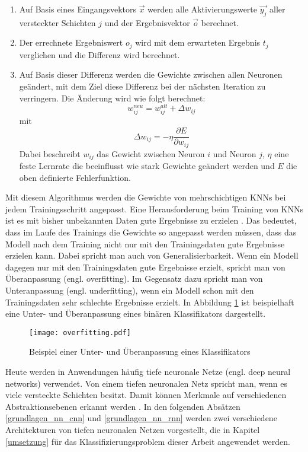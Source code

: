 \begin{enumerate}
\item Auf Basis eines Eingangsvektors $\vec{x}$ werden alle Aktivierungswerte $\vec{y_j}$ aller versteckter Schichten $j$ und der Ergebnisvektor $\vec{o}$ berechnet.
\item Der errechnete Ergebniswert $o_j$ wird mit dem erwarteten Ergebnis $t_j$ verglichen und die Differenz wird berechnet.
\item Auf Basis dieser Differenz werden die Gewichte zwischen allen Neuronen geändert, mit dem Ziel diese Differenz bei der nächsten Iteration zu verringern. Die Änderung wird wie folgt berechnet:
\begin{equation}
w^{neu}_{ij} = w^{alt}_{ij} + \Delta w_{ij}
\end{equation}
mit
\begin{equation}
\Delta w_{ij} = -\eta \frac{\partial E}{\partial w_{ij}}
\end{equation}
Dabei beschreibt $w_{ij}$ das Gewicht zwischen Neuron $i$ und Neuron $j$, $\eta$ eine feste Lernrate die beeinflusst wie stark Gewichte geändert werden und $E$ die oben definierte Fehlerfunktion.
\end{enumerate}

Mit diesem Algorithmus werden die Gewichte von mehrschichtigen \acp{KNN} bei jedem Trainingsschritt angepasst. Eine Herausforderung beim Training von \acp{KNN} ist es mit bisher unbekannten Daten gute Ergebnisse zu erzielen \cite{srivastava2014dropout}. Das bedeutet, dass im Laufe des Trainings die Gewichte so angepasst werden müssen, dass das Modell nach dem Training nicht nur mit den Trainingsdaten gute Ergebnisse erzielen kann. Dabei spricht man auch von Generalisierbarkeit. Wenn ein Modell dagegen nur mit den Trainingsdaten gute Ergebnisse erzielt, spricht man von Überanpassung (engl. overfitting). Im Gegensatz dazu spricht man von Unteranpassung (engl. underfitting), wenn ein Modell schon mit den Trainingsdaten sehr schlechte Ergebnisse erzielt. In Abbildung \ref{fig_overfitting} ist beispielhaft eine Unter- und Überanpassung eines binären Klassifikators dargestellt.

\begin{figure}[h]
\centering
\texttt{[image: overfitting.pdf]}
\caption{Beispiel einer Unter- und Überanpassung eines Klassifikators}
\label{fig_overfitting}
\end{figure}

Heute werden in Anwendungen häufig tiefe neuronale Netze (engl. deep neural networks) verwendet. Von einem tiefen neuronalen Netz spricht man, wenn es viele versteckte Schichten besitzt. Damit können Merkmale auf verschiedenen Abstraktionsebenen erkannt werden \cite{lecun2015deep}. In den folgenden Absätzen \ref{grundlagen_nn_cnn} und \ref{grundlagen_nn_rnn} werden zwei verschiedene Architekturen von tiefen neuronalen Netzen vorgestellt, die in Kapitel \ref{umsetzung} für das Klassifizierungsproblem dieser Arbeit angewendet werden.


